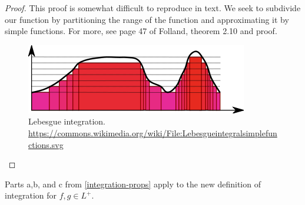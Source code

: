 \documentclass[11pt,leqno,oneside]{amsbook}
\numberwithin{thm}{section}
\begin{document}
\begin{proof}
  This proof is somewhat difficult to reproduce in text. We seek to
  subdivide our function by partitioning the range of the function and
  approximating it by simple
  functions. For more, see page 47 of Folland, theorem 2.10 and proof.\\
  \begin{figure}[h]
  \includegraphics[scale=0.5]{images/lebesgue-integral-simple-functions.png}   
    \caption{Lebesgue integration. 
      \url{https://commons.wikimedia.org/wiki/File:Lebesgueintegralsimplefunctions.svg}}
    \label{fig:lebesgue-integration}
  \end{figure}
\end{proof}
\begin{prop}
  Parts a,b, and c from \ref{integration-props} apply to the new
  definition of integration for $f,g \in L^+$. 
\end{prop}
\end{document}
